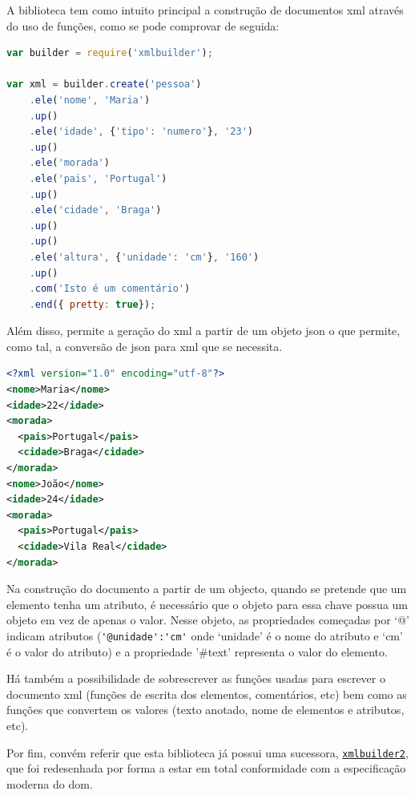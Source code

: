 A biblioteca tem como intuito principal a construção de documentos \acrshort{xml} através do uso de funções, como se pode comprovar de seguida:

\begin{lstlisting}[language=javascript, caption=Código para a construção em \acrshort{xml} do exemplo~\ref{exem:xmlEx} usando o \texttt{xmlbuilder}]
var builder = require('xmlbuilder');
 
var xml = builder.create('pessoa')
    .ele('nome', 'Maria')
    .up()
    .ele('idade', {'tipo': 'numero'}, '23')
    .up()
    .ele('morada')
    .ele('pais', 'Portugal')
    .up()
    .ele('cidade', 'Braga')
    .up()
    .up()
    .ele('altura', {'unidade': 'cm'}, '160')
    .up()
    .com('Isto é um comentário')
    .end({ pretty: true});
\end{lstlisting}

Além disso, permite a geração do \acrshort{xml} a partir de um objeto \acrshort{json} o que permite, como tal, a conversão de \acrshort{json} para \acrshort{xml} que se necessita.

\begin{lstlisting}[language=xml, caption=Resultado da conversão do exemplo~\ref{exem:jsonBib} usando o conversor \texttt{xmlbuilder}]
<?xml version="1.0" encoding="utf-8"?>
<nome>Maria</nome>
<idade>22</idade>
<morada>
  <pais>Portugal</pais>
  <cidade>Braga</cidade>
</morada>
<nome>João</nome>
<idade>24</idade>
<morada>
  <pais>Portugal</pais>
  <cidade>Vila Real</cidade>
</morada>
\end{lstlisting}

Na construção do documento a partir de um objecto, quando se pretende que um elemento tenha um atributo, é necessário que o objeto para essa chave possua um objeto em vez de apenas o valor. Nesse objeto, as propriedades começadas por `@' indicam atributos (\verb|'@unidade':'cm'| onde `unidade' é o nome do atributo e `cm' é o valor do atributo) e a propriedade '\#text' representa o valor do elemento.

Há também a possibilidade de sobrescrever as funções usadas para escrever o documento \acrshort{xml} (funções de escrita dos elementos, comentários, etc) bem como as funções que convertem os valores (texto anotado, nome de elementos e atributos, etc).

Por fim, convém referir que esta biblioteca já possui uma sucessora, \href{https://www.npmjs.com/package/xmlbuilder2}{\texttt{xmlbuilder2}}, que foi redesenhada por forma a estar em total conformidade com a especificação moderna do \acrshort{dom}.

